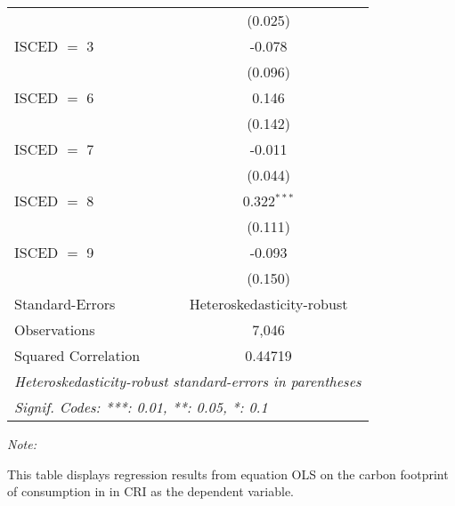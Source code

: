 \begin{table}[htbp!]
\begin{adjustbox}{width = 1\textwidth, max height = 0.95\textheight, center}
\begin{threeparttable}[b]
\begin{tabular}{lc}
                                & (0.025)\\   
            ISCED $=$ 3         & -0.078\\   
                                & (0.096)\\   
            ISCED $=$ 6         & 0.146\\   
                                & (0.142)\\   
            ISCED $=$ 7         & -0.011\\   
                                & (0.044)\\   
            ISCED $=$ 8         & 0.322$^{***}$\\   
                                & (0.111)\\   
            ISCED $=$ 9         & -0.093\\   
                                & (0.150)\\   
            \midrule 
            Standard-Errors     & Heteroskedasticity-robust \\   
            Observations        & 7,046\\  
            Squared Correlation & 0.44719\\  
            \midrule \midrule
            \multicolumn{2}{l}{\emph{Heteroskedasticity-robust standard-errors in parentheses}}\\
            \multicolumn{2}{l}{\emph{Signif. Codes: ***: 0.01, **: 0.05, *: 0.1}}\\
         \end{tabular}
         
         \begin{tablenotes}\item \medskip \textit{Note:}
            \item This table displays regression results from equation OLS on the carbon footprint of consumption in  in CRI as the dependent variable.  
         \end{tablenotes}
      \end{threeparttable}
   \end{adjustbox}
\end{table}


